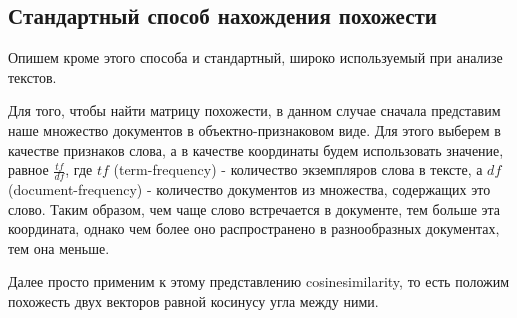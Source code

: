 \subsection{Стандартный способ нахождения похожести}
Опишем кроме этого способа и стандартный, широко используемый при анализе текстов.

Для того, чтобы найти матрицу похожести, в данном случае сначала представим наше множество документов в объектно-признаковом виде. Для этого выберем в качестве признаков слова, а в качестве координаты будем использовать значение, равное $\frac{tf}{df}$, где $tf$ (term-frequency) - количество экземпляров слова в тексте, а $df$ (document-frequency) - количество документов из множества, содержащих это слово. Таким образом, чем чаще слово встречается в документе, тем больше эта координата, однако чем более оно распространено в разнообразных документах, тем она меньше.

Далее просто применим к этому представлению cosinesimilarity, то есть положим похожесть двух векторов равной косинусу угла между ними.